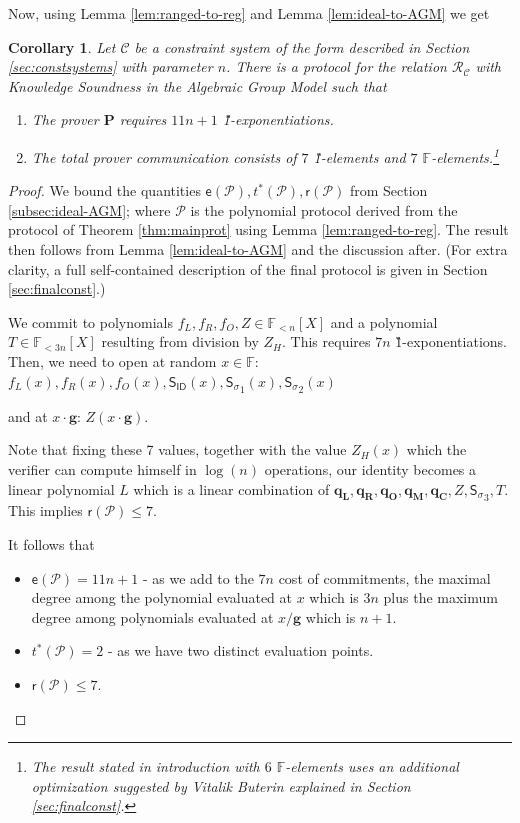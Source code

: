 \documentclass[11pt]{article} %
\newcommand{\F}{\ensuremath{\mathbb F}\xspace}
\newcommand{\proverexp}{\ensuremath{\mathsf{e}}\xspace}
\newcommand{\reducedelems}{\ensuremath{\mathsf{r}}\xspace}
\newcommand{\prv}{\ensuremath{\mathsf{\mathbf{P}}}\xspace}
\newcommand{\rel}{\ensuremath{\mathcal{R}}\xspace}
\newcommand{\hgen}{\ensuremath{\mathbf{g}}\xspace}
\newcommand{\polysofdeg}[1]{\ensuremath{\F_{< #1}[X]}\xspace}
\newcommand{\prot}{\ensuremath{\mathscr{P}}\xspace}
\newcommand{\sigpoly}{\ensuremath{\mathsf{S_{\sigma}}}\xspace}
\newcommand{\idpoly}{\ensuremath{\mathsf{S_{ID}}}\xspace}
\newcommand{\selleft}{\ensuremath{\mathbf{q_L}}\xspace}
\newcommand{\selright}{\ensuremath{\mathbf{q_R}}\xspace}
\newcommand{\selout}{\ensuremath{\mathbf{q_O}}\xspace}
\newcommand{\selmult}{\ensuremath{\mathbf{q_M}}\xspace}
\newcommand{\selconst}{\ensuremath{\mathbf{q_C}}\xspace}
\newcommand{\constsystem}{\ensuremath{\mathscr{C}}\xspace}
\newcommand{\relof}[1]{\ensuremath{\rel_{#1}}\xspace}
\newtheorem{corollary}[lemma]{Corollary}
\begin{document}
 \noindent
 Now, using Lemma \ref{lem:ranged-to-reg} and Lemma \ref{lem:ideal-to-AGM} we get
 \begin{corollary}\label{cor:final}
  Let \constsystem be a constraint system of the form described in Section \ref{sec:constsystems} with parameter $n$. There is a protocol for the relation \relof{\constsystem} with Knowledge Soundness in the Algebraic Group Model such that
   \begin{enumerate}
  \item The prover \prv requires $11n+1$ \G1-exponentiations.
  \item The total prover communication consists of $7$ \G1-elements and $7$ \F-elements.\footnote{The result stated in introduction with $6$ \F-elements uses an additional optimization suggested by Vitalik Buterin explained in Section \ref{sec:finalconst}.} 
 \end{enumerate}

 \end{corollary}
\begin{proof}
We bound the quantities $\proverexp(\prot),t^*(\prot),\reducedelems(\prot)$ from Section \ref{subsec:ideal-AGM}; where \prot is the polynomial protocol derived from the protocol of Theorem \ref{thm:mainprot} using Lemma \ref{lem:ranged-to-reg}. The result then follows from Lemma \ref{lem:ideal-to-AGM} and the discussion after. 
(For extra clarity, a full self-contained description of the final protocol is given in Section \ref{sec:finalconst}.)

We commit to polynomials $f_L,f_R,f_O,Z\in\polysofdeg{n}$ and a polynomial $T\in \polysofdeg{3n}$ resulting from division by $Z_{H}$.
This requires $7n$ \G1-exponentiations.
Then, we need to open at random $x\in \F$: $f_L(x),f_R(x),f_O(x),\idpoly(x),\sigpoly_1(x),\sigpoly_2(x)$

and at $x\cdot \hgen$:
$Z(x\cdot \hgen)$.

Note that fixing these 7 values, together with the value $Z_H(x)$ which the verifier can compute himself in $\log(n)$ operations, our identity becomes a linear polynomial $L$ which is a linear combination of $\selleft,\selright,\selout,\selmult,\selconst,Z,\sigpoly_3,T$. This implies $\reducedelems(\prot)\leq 7$.

It follows that
\begin{itemize}
 \item 
$\proverexp(\prot) = 11n+1$ -
as we add to the $7n$ cost of commitments, the maximal degree among the polynomial evaluated at $x$ which is $3n$ plus the maximum degree among polynomials evaluated at $x/\hgen$ which is $n+1$.
\item $t^*(\prot)=2$ - as we have two distinct evaluation points.
\item $\reducedelems(\prot)\leq 7$.

\end{itemize}


\end{proof}
\end{document}
